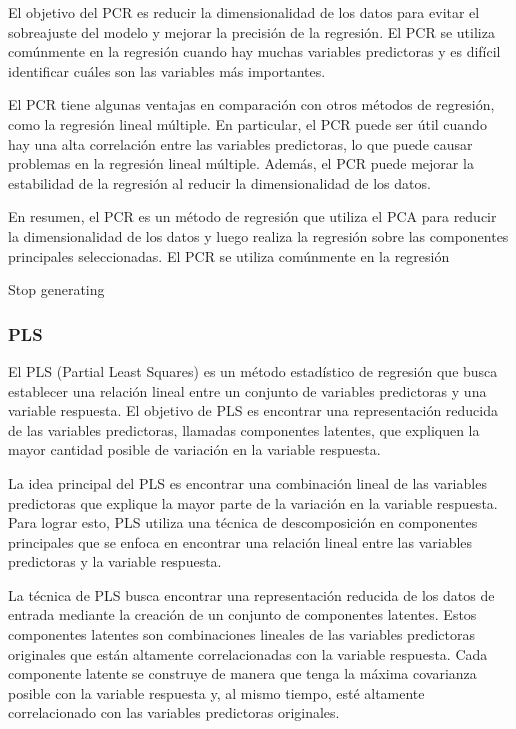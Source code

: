 \documentclass[
  letterpaper,
  DIV=11,
  numbers=noendperiod]{scrartcl}
\begin{document}
El objetivo del PCR es reducir la dimensionalidad de los datos para
evitar el sobreajuste del modelo y mejorar la precisión de la regresión.
El PCR se utiliza comúnmente en la regresión cuando hay muchas variables
predictoras y es difícil identificar cuáles son las variables más
importantes.

El PCR tiene algunas ventajas en comparación con otros métodos de
regresión, como la regresión lineal múltiple. En particular, el PCR
puede ser útil cuando hay una alta correlación entre las variables
predictoras, lo que puede causar problemas en la regresión lineal
múltiple. Además, el PCR puede mejorar la estabilidad de la regresión al
reducir la dimensionalidad de los datos.

En resumen, el PCR es un método de regresión que utiliza el PCA para
reducir la dimensionalidad de los datos y luego realiza la regresión
sobre las componentes principales seleccionadas. El PCR se utiliza
comúnmente en la regresión

Stop generating

\hypertarget{pls}{%
\subsubsection{PLS}\label{pls}}

El PLS (Partial Least Squares) es un método estadístico de regresión que
busca establecer una relación lineal entre un conjunto de variables
predictoras y una variable respuesta. El objetivo de PLS es encontrar
una representación reducida de las variables predictoras, llamadas
componentes latentes, que expliquen la mayor cantidad posible de
variación en la variable respuesta.

La idea principal del PLS es encontrar una combinación lineal de las
variables predictoras que explique la mayor parte de la variación en la
variable respuesta. Para lograr esto, PLS utiliza una técnica de
descomposición en componentes principales que se enfoca en encontrar una
relación lineal entre las variables predictoras y la variable respuesta.

La técnica de PLS busca encontrar una representación reducida de los
datos de entrada mediante la creación de un conjunto de componentes
latentes. Estos componentes latentes son combinaciones lineales de las
variables predictoras originales que están altamente correlacionadas con
la variable respuesta. Cada componente latente se construye de manera
que tenga la máxima covarianza posible con la variable respuesta y, al
mismo tiempo, esté altamente correlacionado con las variables
predictoras originales.
\end{document}
